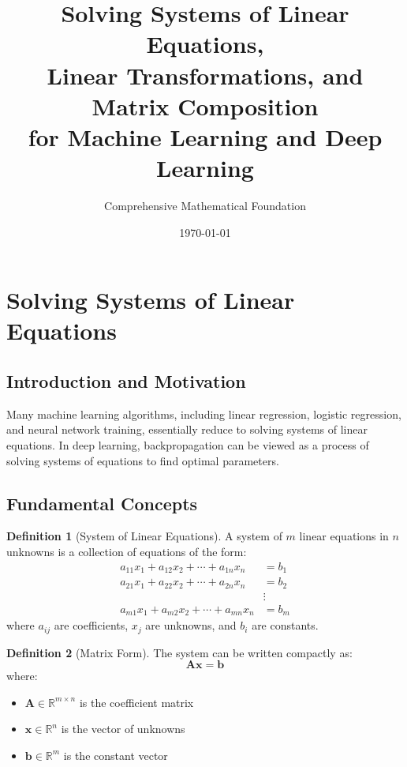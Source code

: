 \documentclass[12pt,a4paper]{article}
\title{\textbf{Solving Systems of Linear Equations, \\Linear Transformations, and Matrix Composition \\ for Machine Learning and Deep Learning}}
\author{Comprehensive Mathematical Foundation}
\date{\today}
\theoremstyle{definition}
\newtheorem{definition}{Definition}[section]
\begin{document}
\maketitle
\tableofcontents
\newpage

\section{Solving Systems of Linear Equations}

\subsection{Introduction and Motivation}

\begin{tcolorbox}[enhanced,breakable,colback=defcolor,colframe=red!75!black,title=Why Study Systems of Linear Equations in ML/DL?]
Many machine learning algorithms, including linear regression, logistic regression, and neural network training, essentially reduce to solving systems of linear equations. In deep learning, backpropagation can be viewed as a process of solving systems of equations to find optimal parameters.
\end{tcolorbox}

\subsection{Fundamental Concepts}

\begin{definition}[System of Linear Equations]
A system of $m$ linear equations in $n$ unknowns is a collection of equations of the form:
\begin{align*}
a_{11}x_1 + a_{12}x_2 + \cdots + a_{1n}x_n &= b_1 \\
a_{21}x_1 + a_{22}x_2 + \cdots + a_{2n}x_n &= b_2 \\
&\vdots \\
a_{m1}x_1 + a_{m2}x_2 + \cdots + a_{mn}x_n &= b_m
\end{align*}
where $a_{ij}$ are coefficients, $x_j$ are unknowns, and $b_i$ are constants.
\end{definition}

\begin{definition}[Matrix Form]
The system can be written compactly as:
\[
\mathbf{Ax} = \mathbf{b}
\]
where:
\begin{itemize}
\item $\mathbf{A} \in \mathbb{R}^{m \times n}$ is the coefficient matrix
\item $\mathbf{x} \in \mathbb{R}^{n}$ is the vector of unknowns
\item $\mathbf{b} \in \mathbb{R}^{m}$ is the constant vector
\end{itemize}
\end{definition}
\end{document}
